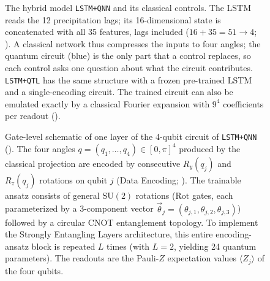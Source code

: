 \documentclass[11pt,a4paper]{article}
\begin{document}
\begin{figure}[htbp]
\caption{The hybrid model \texttt{LSTM+QNN} and its classical controls. The LSTM reads the 12 precipitation lags; its 16-dimensional state is concatenated with all 35 features, lags included ($16+35=51\to4$; ). A classical network thus compresses the inputs to four angles; the quantum circuit (blue) is the only part that a control replaces, so each control asks one question about what the circuit contributes. \texttt{LSTM+QTL} has the same structure with a frozen pre-trained LSTM and a single-encoding circuit. The trained circuit can also be emulated exactly by a classical Fourier expansion with $9^4$ coefficients per readout ().}
\label{fig:architecture}
\end{figure}

\begin{figure}[htbp]
    \centering
    \caption{Gate-level schematic of one layer of the 4-qubit circuit of \texttt{LSTM+QNN} (). The four angles $q=(q_1,\dots,q_4)\in[0,\pi]^4$ produced by the classical projection are encoded by consecutive $R_y(q_j)$ and $R_z(q_j)$ rotations on qubit $j$ (Data Encoding; \citealp{perez2020}). The trainable ansatz consists of general
    $\mathrm{SU}(2)$ rotations ($\mathrm{Rot}$ gates, each parameterized by a 3-component vector
    $\vec\theta_j = (\theta_{j,1}, \theta_{j,2}, \theta_{j,3})$) followed by a circular CNOT
    entanglement topology. To implement the Strongly Entangling Layers architecture, this entire
    encoding-ansatz block is repeated $L$ times (with $L=2$, yielding 24 quantum parameters). The readouts are the Pauli-$Z$ expectation values $\langle Z_j\rangle$ of the four qubits.}
    \label{fig:vqc_circuit}
\end{figure}
\end{document}
